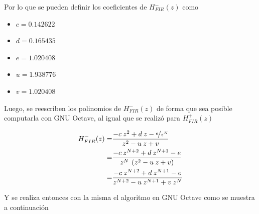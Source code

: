     Por lo que se pueden definir los coeficientes de $H_{FIR}^{-}(z)$ como

    \begin{itemize}
      \item $c = 0.142622$
      \item $d = 0.165435$
      \item $e = 1.020408$
      \item $u = 1.938776$
      \item $v = 1.020408$
    \end{itemize}

    Luego, se reescriben los polinomios de $H_{FIR}^{-}(z)$ de forma que sea posible computarla con GNU Octave, al igual que se realizó para $H_{FIR}^{+}(z)$

    \begin{align}
      H_{FIR}^{-}(z) =& \frac{-c \: z^{2} + d \: z - \nicefrac{e}{z^{N}}}{z^{2} - u \: z + v} \nonumber \\
      =& \frac{-c \: z^{N+2} + d \: z^{N+1} - e}{z^{N} \: \left( z^{2} - u \: z + v \right)} \nonumber \\
      =& \frac{-c \: z^{N+2} + d \: z^{N+1} - e}{z^{N+2} - u \: z^{N+1} + v \: z^{N}}
    \end{align}

    Y se realiza entonces con la misma el algoritmo en GNU Octave como se muestra a continuación

    

